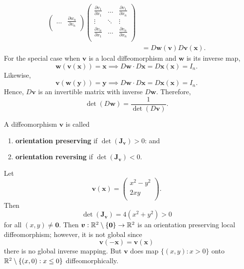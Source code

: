 \begin{remark}
\begin{align*}
\begin{pmatrix}
            \ldots &
            \frac{\partial w_n}{\partial v_n} \\
        \end{pmatrix}
        \begin{pmatrix}
            \frac{\partial v_1}{\partial x_1} &
            \ldots &
            \frac{\partial v_1}{\partial x_n} \\
            \vdots & \ddots & \vdots \\
            \frac{\partial v_n}{\partial x_1} &
            \ldots &
            \frac{\partial v_n}{\partial x_n} \\
        \end{pmatrix} \\
        &= D\bm w(\bm v) D\bm v(\bm x).
    \end{align*}
    For the special case when $\bm v$ is a local diffeomorphism and
    $\bm w$ is its inverse map, 
    \[\bm w(\bm v(\bm x)) = 
        \bm x \implies D\bm w \cdot D\bm x = 
        D\bm x(\bm x) = I_n. \]
    Likewise,
    \[ \bm v(\bm w(\bm y)) = 
        \bm y \implies D\bm w \cdot D\bm x = 
        D\bm x(\bm x) = I_n. \]
    Hence, $D\bm v$ is an invertible matrix with inverse $D\bm w$. 
    Therefore, 
    \[
        \det(D\bm w) = \frac1{\det(D\bm v)}.
    \]
\end{remark}

\begin{definition}[]
    A diffeomorphism $\bm v$ is called
    \begin{enumerate}
        \item \textbf{orientation preserving} if $\det(\bm J_{\bm v}) > 0$: and
        \item \textbf{orientation reversing} if $\det(\bm J_{\bm v}) < 0$.
    \end{enumerate}
\end{definition}

\begin{example}
    Let
    \[
        \bm v(\bm x) =
        \begin{pmatrix}
            x^2 - y^2 \\
            2xy \\
        \end{pmatrix}
        .
    \]
    Then
    \[ \det(\bm J_{\bm v}) = 4(x^2 + y^2) > 0 \]
    for all $(x, y) \neq \bm 0$.
    Then $\bm v: \mathbb{R}^2 \setminus \{\bm 0\} \to \mathbb{R}^2$ is an orientation
    preserving local diffeomorphism;
    however, it is not global since
    \[ \bm v(-\bm x) = \bm v(\bm x) \]
    there is no global inverse mapping.
    But $\bm v$ does map $\{(x, y): x > 0\}$ onto
    $\mathbb{R}^2 \setminus \{(x, 0): x \leq 0\}$
    diffeomorphically.
\end{example}

